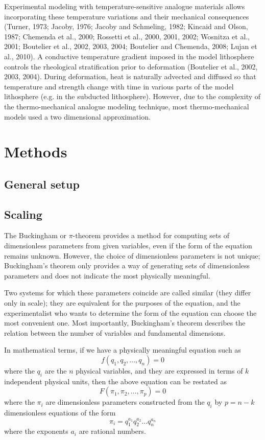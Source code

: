 \documentclass[11pt]{article}
\begin{document}
Experimental modeling with temperature-sensitive analogue materials allows incorporating these temperature variations and their mechanical consequences (Turner, 1973; Jacoby, 1976; Jacoby and Schmeling, 1982; Kincaid and Olson, 1987; Chemenda et al., 2000; Rossetti et al., 2000, 2001, 2002; Wosnitza et al., 2001; Boutelier et al., 2002, 2003, 2004; Boutelier and Chemenda, 2008; Lujan et al., 2010). A conductive temperature gradient imposed in the model lithosphere controls the rheological stratification prior to deformation (Boutelier et al., 2002, 2003, 2004). During deformation, heat is naturally advected and diffused so that temperature and strength change with time in various parts of the model lithosphere (e.g. in the subducted lithosphere). However, due to the complexity of the thermo-mechanical analogue modeling technique, most thermo-mechanical models used a two dimensional approximation.

\section*{Methods}
\subsection*{General setup}
\subsection*{Scaling}

The Buckingham or $\pi$-theorem provides a method for computing sets of dimensionless parameters from given variables, even if the form of the equation remains unknown. However, the choice of dimensionless parameters is not unique; Buckingham's theorem only provides a way of generating sets of dimensionless parameters and does not indicate the most physically meaningful.

Two systems for which these parameters coincide are called similar (they differ only in scale); they are equivalent for the purposes of the equation, and the experimentalist who wants to determine the form of the equation can choose the most convenient one. Most importantly, Buckingham's theorem describes the relation between the number of variables and fundamental dimensions.

In mathematical terms, if we have a physically meaningful equation such as
\begin{equation}
f ( q_1 , q_2 ,\ldots , q_n ) = 0
\end{equation}
where the $q_i$ are the $n$ physical variables, and they are expressed in terms of $k$ independent physical units, then the above equation can be restated as
\begin{equation}
F( \pi_1 , \pi_2 ,\ldots , \pi_p ) = 0
\end{equation}
where the $\pi_i$ are dimensionless parameters constructed from the $q_i$ by $p = n - k$ dimensionless equations of the form
\begin{equation}
\pi_i = q_{1}^{a_1} q_{2}^{a_2} \ldots q_{n}^{a_n}
\end{equation}
where the exponents $a_i$ are rational numbers.
\end{document}
